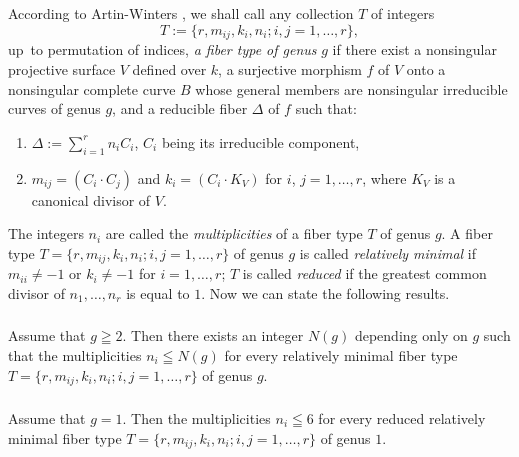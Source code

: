 \subsection{}\label{chap2:4.4}
According to Artin-Winters \cite{7}, we shall call any collection $T$
of integers
$$
T:=\{r,m_{ij},k_{i},n_{i};i,j=1,\ldots,r\},
$$
up\pageoriginale\ to permutation of indices, {\em a fiber type of
  genus} $g$ if there exist a nonsingular projective surface $V$
defined over $k$, a surjective morphism $f$ of $V$ onto a nonsingular
complete curve $B$ whose general members are nonsingular irreducible
curves of genus $g$, and a reducible fiber $\Delta$ of $f$ such that: 
\begin{enumerate}
\renewcommand{\labelenumi}{(\theenumi)}
\item $\Delta:={\displaystyle{\mathop{\sum}^{r}_{i=1}}}n_{i}C_{i}$,
  $C_{i}$ being its irreducible component,

\item $m_{ij}=(C_{i}\cdot C_{j})$ and $k_{i}=(C_{i}\cdot K_{V})$ for
  $i$, $j=1,\ldots,r$, where $K_{V}$ is a canonical divisor of $V$.
\end{enumerate}
The integers $n_{i}$ are called the {\em multiplicities} of a fiber
type $T$ of genus $g$. A fiber type
$T=\{r,m_{ij},k_{i},n_{i};i,j=1,\ldots,r\}$ of genus $g$ is called
{\em relatively minimal} if $m_{ii}\neq -1$ or $k_{i}\neq -1$ for
$i=1,\ldots,r$; $T$ is called {\em reduced} if the greatest common
divisor of $n_{1},\ldots,n_{r}$ is equal to $1$. Now we can state the
following results.

\subsubsection{}\label{chap2:4.4.1}
\begin{lemma*}
  Assume that $g\geqq 2$. Then there exists an integer $N(g)$ depending
  only on $g$ such that the multiplicities $n_{i}\leqq N(g)$ for every
  relatively minimal fiber type
  $T=\{r,m_{ij},k_{i},n_{i};i,j=1,\ldots,r\}$ of genus $g$.
\end{lemma*}

\subsubsection{}\label{chap2:4.4.2} 
\begin{lemma*}
  Assume that $g=1$. Then the multiplicities $n_{i}\leqq 6$ for every
  reduced relatively minimal fiber type
  $T=\{r,m_{ij},k_{i},n_{i};i,j=1,\ldots,r\}$ of genus $1$.
\end{lemma*}

